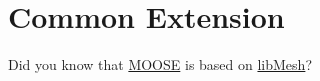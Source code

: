 
\chapter{\label{common-extension}Common Extension}
\par Did you know that \href{https:://mooseframework.inl.gov}{MOOSE} is based on \href{https://libmesh.github.io/}{libMesh}? 